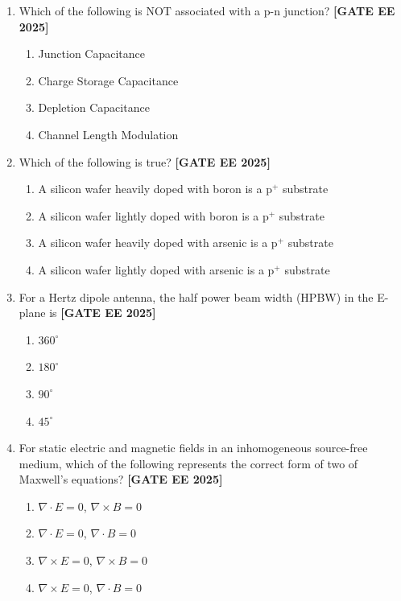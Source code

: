 \documentclass[12pt,a4paper]{article}
\begin{document}
\begin{enumerate}[leftmargin=2.5em, label=\textbf{Q.\arabic*}., itemsep=2em]
\item
Which of the following is NOT associated with a p-n junction?
\newline
\noindent \textbf{[GATE EE 2025]}
\begin{enumerate}[label=(\Alph*)]
  \item Junction Capacitance
  \item Charge Storage Capacitance
  \item Depletion Capacitance
  \item Channel Length Modulation
\end{enumerate}

\item
Which of the following is true?
\newline
\noindent \textbf{[GATE EE 2025]}
\begin{enumerate}[label=(\Alph*)]
  \item A silicon wafer heavily doped with boron is a p$^+$ substrate
  \item A silicon wafer lightly doped with boron is a p$^+$ substrate
  \item A silicon wafer heavily doped with arsenic is a p$^+$ substrate
  \item A silicon wafer lightly doped with arsenic is a p$^+$ substrate
\end{enumerate}

\item
For a Hertz dipole antenna, the half power beam width (HPBW) in the E-plane is
\newline
\noindent \textbf{[GATE EE 2025]}
\begin{enumerate}[label=(\Alph*)]
  \item $360^\circ$
  \item $180^\circ$
  \item $90^\circ$
  \item $45^\circ$
\end{enumerate}

\item
For static electric and magnetic fields in an inhomogeneous source-free medium, which of the following represents the correct form of two of Maxwell's equations?
\newline
\noindent \textbf{[GATE EE 2025]}
\begin{enumerate}[label=(\Alph*)]
  \item $\nabla \cdot E = 0$, \quad $\nabla \times B = 0$
  \item $\nabla \cdot E = 0$, \quad $\nabla \cdot B = 0$
  \item $\nabla \times E = 0$, \quad $\nabla \times B = 0$
  \item $\nabla \times E = 0$, \quad $\nabla \cdot B = 0$
\end{enumerate}



\end{enumerate}
\end{document}
